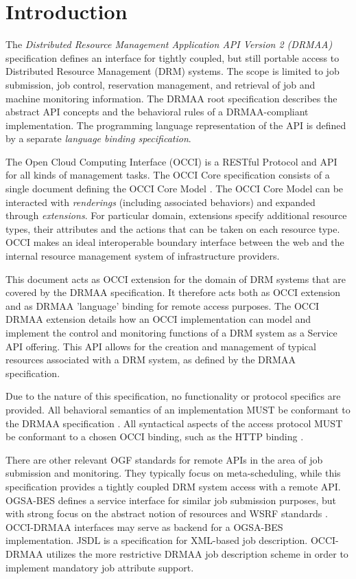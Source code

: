 \documentclass[10pt]{article}
\begin{document}
\newpage
\tableofcontents
\newpage

\section{Introduction}
\label{sec:introduction}

 The \emph{Distributed Resource Management Application API Version 2 (DRMAA)} specification defines an interface for tightly coupled, but still portable access to Distributed Resource Management (DRM) systems. The scope is limited to job submission, job control, reservation management, and retrieval of job and machine monitoring information. The DRMAA root specification describes the abstract API concepts and the behavioral rules of a DRMAA-compliant implementation. The programming language representation of the API is defined by a separate \emph{language binding specification}.  
 
The Open Cloud Computing Interface (OCCI) is a RESTful Protocol and API for all kinds of management tasks. The OCCI Core specification consists of a single document defining the OCCI Core Model  \cite{gfd183}. The OCCI Core Model can be interacted with \emph{renderings} (including associated behaviors) and expanded through \emph{extensions}. For particular domain, extensions specify additional resource types, their attributes and the actions that can be taken on each resource type. OCCI makes an ideal interoperable boundary interface between the web and the internal resource management system of infrastructure providers.

This document acts as OCCI extension for the domain of DRM systems that are covered by the DRMAA specification. It therefore acts both as OCCI extension and as DRMAA 'language' binding for remote access purposes. The OCCI DRMAA extension details how an OCCI implementation can model and implement the control and monitoring functions of a DRM system as a Service API offering. This API allows for the creation and management of typical resources associated with a DRM system, as defined by the DRMAA specification. 

Due to the nature of this specification, no functionality or protocol specifics are provided. All behavioral semantics of an implementation MUST be conformant to the DRMAA specification \cite{gfd194}. All syntactical aspects of the access protocol MUST be conformant to a chosen OCCI binding, such as the HTTP binding \cite{gfd185}.

There are other relevant OGF standards for remote APIs in the area of job submission and monitoring. They typically focus on meta-scheduling, while this specification provides a tightly coupled DRM system access with a remote API. OGSA-BES \cite{gfd108} defines a service interface for similar job submission purposes, but with strong focus on the abstract notion of resources and WSRF standards \cite{wsrf}. OCCI-DRMAA interfaces may serve as backend for a OGSA-BES implementation. JSDL \cite{gfd56} is a specification for XML-based job description. OCCI-DRMAA utilizes the more restrictive DRMAA job description scheme in order to implement mandatory job attribute support.   
\end{document}
